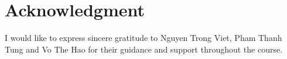 \cleardoublepage
{}
{}
\renewcommand{\bibname}{Reference}



\cleardoublepage
{}
{}
\chapter*{Acknowledgment}

I would like to express sincere gratitude to Nguyen Trong Viet, Pham Thanh Tung and Vo The Hao for their guidance and support throughout the course.